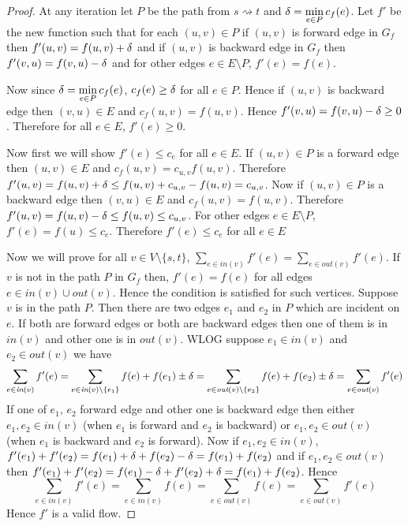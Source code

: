 \begin{proof}
	At any iteration  let $P$ be the path from $s\rightsquigarrow t$ and $\delta=\min\limits_{e\in P}c_f(e)$. Let $f'$ be the new function such that for each $(u,v)\in P$ if $(u,v)$ is forward edge in $G_f$ then $f'(u,v)=f(u,v)+\delta$ and if $(u,v)$ is backward edge in $G_f$ then $f'(v,u)=f(v,u)-\delta$ and for other edges $e\in E\setminus P$, $f'(e)=f(e)$.

	Now since $\delta=\min\limits_{e\in P}c_f(e)$, $c_f(e)\geq \delta$ for all $e\in P$. Hence if $(u,v)$ is backward edge then $(v,u)\in E$ and $c_f(u,v)=f(u,v)$. Hence $f'(v,u)=f(v,u)-\delta\geq 0$. Therefore for all $e\in E$, $f'(e)\geq 0$.

	Now first we will show $f'(e)\leq c_e$ for all $e\in E$. If $(u,v)\in P$ is a forward edge then $(u,v)\in E$ and $c_f(u,v)=c_{u,v}f(u,v)$. Therefore $f'(u,v)=f(u,v)+\delta\leq f(u,v)+c_{u,v}-f(u,v)=c_{u,v}$. Now if $(u,v)\in P$ is a backward edge then $(v,u)\in E$ and $c_f(u,v)=f(u,v)$. Therefore $f'(u,v)=f(u,v)-\delta\leq f(u,v)\leq c_{u,v}$. For other edges $e\in E\setminus P$, $f'(e)=f(u)\leq c_e$. Therefore $f'(e)\leq c_e$ for all $e\in E$

	Now we will prove for all $v\in V\setminus\{s,t\}$, $\sum\limits_{e\in \textit{in}(v)}f'(e)=\sum\limits_{e\in\textit{out}(v)}f'(e)$. If $v$ is not in the path $P$ in $G_f$ then, $f'(e)=f(e)$ for all edges $e\in \textit{in}(v)\cup \textit{out}(v)$. Hence the condition is satisfied for such vertices. Suppose $v$ is in the path $P$. Then there are two edges $e_1$ and $e_2$ in $P$ which are incident on $e$. If both are forward edges or both are backward edges then one of them is in $\textit{in}(v)$ and other one is in $\textit{out}(v)$. WLOG suppose $e_1\in \textit{in}(v)$ and $e_2\in\textit{out}(v)$ we have $$\sum\limits_{e\in \textit{in}(v)}f'(e)=\sum\limits_{e\in \textit{in}(v)\setminus\{e_1\}}f(e)+f(e_1)\pm \delta=\sum\limits_{e\in\textit{out}(v)\setminus \{e_2\}}f(e)+f(e_2)\pm \delta=\sum\limits_{e\in\textit{out}(v)}f'(e)$$If one of $e_1$, $e_2$ forward edge and other one is backward edge then either $e_1,e_2\in \textit{in}(v)$ (when $e_1$ is forward and $e_2$ is backward) or $e_1,e_2\in \textit{out}(v)$ (when $e_1$ is backward and $e_2$ is forward). Now if $e_1,e_2\in \textit{in}(v)$, $f'(e_1)+f'(e_2)=f(e_1)+\delta+f(e_2)-\delta=f(e_1)+f(e_2)$ and if $e_1,e_2\in\textit{out}(v)$ then $f'(e_1)+f'(e_2)=f(e_1)-\delta+f'(e_2)+\delta=f(e_1)+f(e_2)$. Hence $$\sum\limits_{e\in \textit{in}(v)}f'(e)=\sum\limits_{e\in \textit{in}(v)}f(e)=\sum\limits_{e\in\textit{out}(v)}f(e)=\sum\limits_{e\in\textit{out}(v)}f'(e)$$ Hence $f'$ is a valid flow.
\end{proof}

